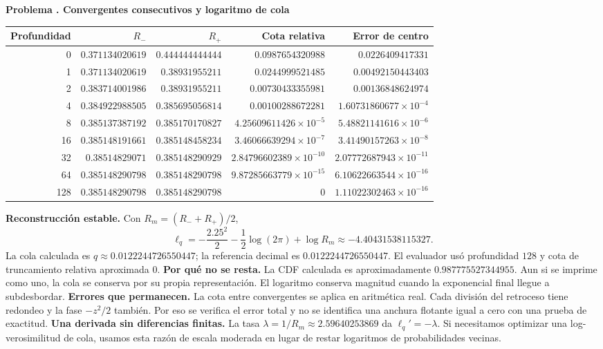 \documentclass[11pt,a4paper]{article}
\theoremstyle{definition}
\newcounter{problema}
\newenvironment{resuelto}[1]{\refstepcounter{problema}\par\medskip\Needspace{6\baselineskip}\textbf{Problema \theproblema. #1}\par}{\par\medskip}
\begin{document}
\begin{resuelto}{Convergentes consecutivos y logaritmo de cola}
\begin{center}\small\begin{tabular}{rrrrr}
\toprule
Profundidad&$R_-$&$R_+$&Cota relativa&Error de centro\\
\midrule
0&$0.371134020619$&$0.444444444444$&$0.0987654320988$&$0.0226409417331$\\
1&$0.371134020619$&$0.38931955211$&$0.0244999521485$&$0.00492150443403$\\
2&$0.383714001986$&$0.38931955211$&$0.00730433355981$&$0.00136848624974$\\
4&$0.384922988505$&$0.385695056814$&$0.00100288672281$&$1.60731860677\times10^{-4}$\\
8&$0.385137387192$&$0.385170170827$&$4.25609611426\times10^{-5}$&$5.48821141616\times10^{-6}$\\
16&$0.385148191661$&$0.385148458234$&$3.46066639294\times10^{-7}$&$3.41490157263\times10^{-8}$\\
32&$0.38514829071$&$0.385148290929$&$2.84796602389\times10^{-10}$&$2.07772687943\times10^{-11}$\\
64&$0.385148290798$&$0.385148290798$&$9.87285663779\times10^{-15}$&$6.10622663544\times10^{-16}$\\
128&$0.385148290798$&$0.385148290798$&$0$&$1.11022302463\times10^{-16}$\\
\bottomrule\end{tabular}\end{center}
\textbf{Reconstrucción estable.} Con $R_m=(R_-+R_+)/2$,
\[
\ell_q=-\frac{2.25^2}{2}-\frac12\log(2\pi)+\log R_m\approx-4.40431538115327.
\]
La cola calculada es $q\approx0.0122244726550447$; la referencia decimal es $0.0122244726550447$. El evaluador usó profundidad $128$ y cota de truncamiento relativa aproximada $0$.
\textbf{Por qué no se resta.} La CDF calculada es aproximadamente $0.987775527344955$. Aun si se imprime como uno, la cola se conserva por su propia representación. El logaritmo conserva magnitud cuando la exponencial final llegue a subdesbordar.
\textbf{Errores que permanecen.} La cota entre convergentes se aplica en aritmética real. Cada división del retroceso tiene redondeo y la fase $-z^2/2$ también. Por eso se verifica el error total y no se identifica una anchura flotante igual a cero con una prueba de exactitud.
\textbf{Una derivada sin diferencias finitas.} La tasa $\lambda=1/R_m\approx2.59640253869$ da $\ell_q\prime=-\lambda$. Si necesitamos optimizar una log-verosimilitud de cola, usamos esta razón de escala moderada en lugar de restar logaritmos de probabilidades vecinas.
\end{resuelto}
\end{document}
